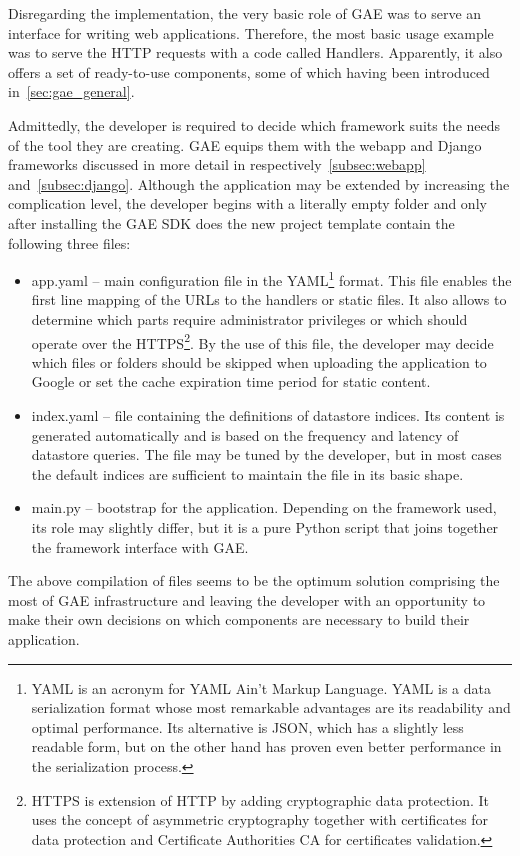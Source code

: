Disregarding the implementation, the very basic role of GAE was to serve an interface for writing web applications. Therefore, the most basic usage example was to serve the HTTP requests with a code called Handlers. Apparently, it also offers a set of ready-to-use components, some of which having been introduced in~\ref{sec:gae_general}. 

Admittedly, the developer is required to decide which framework suits the needs of the tool they are creating. GAE equips them with the webapp and Django frameworks discussed in more detail in respectively~\ref{subsec:webapp} and~\ref{subsec:django}. Although the application may be extended by increasing the complication level, the developer begins with a literally empty folder and only after installing the GAE SDK does the new project template contain the following three files:
\begin{itemize}
\item{app.yaml} -- main configuration file in the YAML\footnote{YAML is an  acronym for YAML Ain't Markup Language. YAML is a data serialization format whose most remarkable advantages are its readability and optimal performance. Its alternative is JSON, which has a slightly less readable form, but on the other hand has proven even better performance in the serialization process.} format. This file enables the first line mapping of the URLs to the handlers or static files. It also allows to determine which parts require administrator privileges or which should operate over the HTTPS\footnote{HTTPS is extension of HTTP by adding cryptographic data protection. It uses the concept of asymmetric cryptography together with certificates for data protection and Certificate Authorities CA for certificates validation.}. By the use of this file, the developer may decide which files or folders should be skipped when uploading the application to Google or set the cache expiration time period for static content.   
\item{index.yaml} -- file containing the definitions of datastore indices. Its content is generated automatically and is based on the frequency and latency of datastore queries. The file may be tuned by the developer, but in most cases the default indices are sufficient to maintain the file in its basic shape.    
\item{main.py} -- bootstrap for the application. Depending on the framework used, its role may slightly differ, but it is a pure Python script that joins together the framework interface with GAE.  
\end{itemize}
The above compilation of files seems to be the optimum solution comprising the most of GAE infrastructure and leaving the developer with an opportunity to make their own decisions on which components are necessary to build their application.

